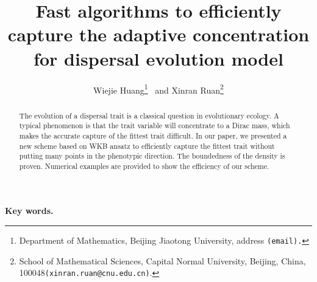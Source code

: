 \documentclass[11pt, dina4, amsfont12]{article}
\title{Fast algorithms to efficiently capture the adaptive concentration for dispersal evolution model}
\author{
Wiejie Huang\thanks{Department of Mathematics, Beijing Jiaotong University, address {\tt (email).}} \ and
Xinran Ruan\thanks{School of Mathematical Sciences, Capital Normal University, Beijing, China, 100048{\tt (xinran.ruan@cnu.edu.cn)}.}
}
\begin{document}
\date{}
\maketitle

\begin{abstract}
The evolution of a dispersal trait is a classical question in evolutionary ecology. A typical phenomenon is that the trait variable will concentrate to a Dirac mass, which makes the accurate capture of the fittest trait difficult. 
In our paper, we presented a new scheme based on WKB ansatz to efficiently capture the fittest trait without putting many points in the phenotypic direction. The boundedness of the density is proven. Numerical examples are provided to show the efficiency of our scheme.
\end{abstract}

{\bf Key words. }  



\end{document}
